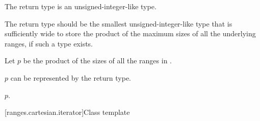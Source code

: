 \begin{itemdescr}
\pnum
The return type is an  unsigned-integer-like type.

\pnum
\recommended
The return type should be the smallest unsigned-integer-like type
that is sufficiently wide to store the product of the maximum sizes of
all the underlying ranges, if such a type exists.

\pnum
Let $p$ be the product of the sizes of all the ranges in .

\pnum
\expects
$p$ can be represented by the return type.

\pnum
\returns
$p$.
\end{itemdescr}

[ranges.cartesian.iterator]{Class template }

